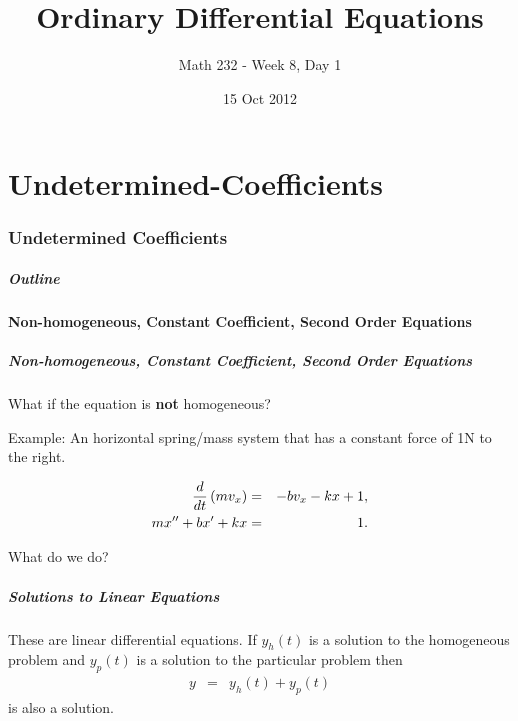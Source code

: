 \part{Undetermined-Coefficients}
\section{Undetermined Coefficients}

\title{Ordinary Differential Equations}
\subtitle{Math 232 - Week 8, Day 1}
\date{15 Oct 2012}

\begin{frame}
  \titlepage
\end{frame}

\begin{frame}
  \frametitle{Outline}
\end{frame}


\subsection{Non-homogeneous, Constant Coefficient, Second Order Equations}


\begin{frame}
  \frametitle{Non-homogeneous, Constant Coefficient, Second Order
    Equations}
  What if the equation is \textbf{not} homogeneous?

  Example: An horizontal spring/mass system that has a constant force
  of 1N to the right.

  \begin{eqnarray*}
    \frac{d}{dt} \left( m v_x \right) & = & -b v_x - kx + 1, \\
    m x'' + bx' + kx & = & 1.
  \end{eqnarray*}

  What do we do?


\end{frame}


\begin{frame}
  \frametitle{Solutions to Linear Equations}

  These are linear differential equations. If $y_h(t)$ is a solution
  to the homogeneous problem and $y_p(t)$ is a solution to the
  particular problem then
  \begin{eqnarray*}
    y & = & y_h(t) + y_p(t)
  \end{eqnarray*}
  is also a solution.

\end{frame}


